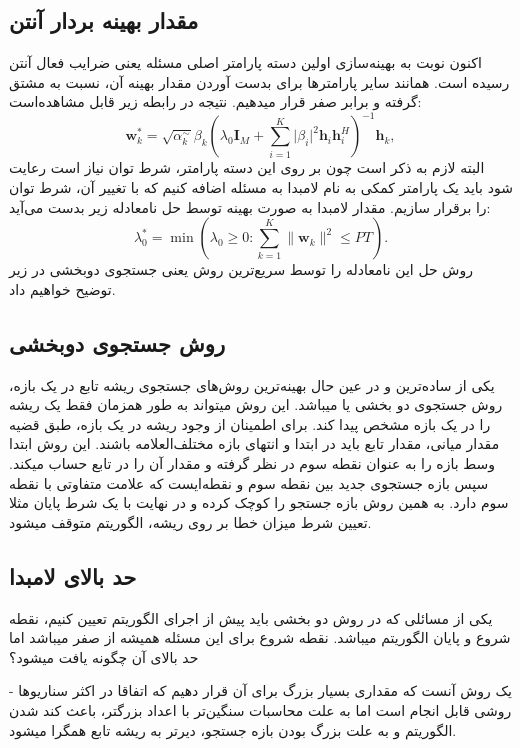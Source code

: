 \subsection{مقدار بهینه بردار آنتن}
اکنون نوبت به بهینه‌سازی اولین دسته پارامتر اصلی مسئله یعنی ضرایب فعال آنتن رسیده است. همانند سایر پارامترها برای بدست آوردن مقدار بهینه آن، نسبت به  مشتق گرفته و برابر صفر قرار میدهیم. نتیجه در رابطه زیر قابل مشاهده‌است:
\[\mathbf{w}_k^* = \sqrt{\alpha_k^\sim} \beta_k \left( \lambda_0 \mathbf{I}_M + \sum_{i=1}^{K} \lvert \beta_i \rvert^2 \mathbf{h}_i \mathbf{h}_i^H \right)^{-1} \mathbf{h}_k,
\]
البته لازم به ذکر است چون بر روی این دسته پارامتر، شرط توان نیاز است رعایت شود باید یک پارامتر کمکی به نام لامبدا به مسئله اضافه کنیم که با تغییر آن، شرط توان را برقرار سازیم.
مقدار لامبدا به صورت بهینه توسط حل نامعادله زیر بدست می‌آید:
\[
\lambda_0^* = \min \left( \lambda_0 \geq 0 : \sum_{k=1}^{K} \lVert \mathbf{w}_k \rVert^2 \leq PT \right).
\]
روش حل این نامعادله را توسط سریع‌ترین روش یعنی جستجوی دوبخشی در زیر توضیح خواهیم داد. 
\subsection{روش جستجوی دوبخشی}
یکی از ساده‌ترین و در عین حال بهینه‌ترین روش‌های جستجوی ریشه تابع در یک بازه، روش جستجوی دو بخشی یا 
میباشد. این روش میتواند به طور همزمان فقط یک ریشه را در یک بازه مشخص پیدا کند. برای اطمینان از وجود ریشه در یک بازه، طبق قضیه مقدار میانی، مقدار تابع باید در ابتدا و انتهای بازه مختلف‌العلامه باشند. این روش ابتدا وسط بازه را به عنوان نقطه سوم در نظر گرفته و مقدار آن را در تابع حساب میکند. سپس بازه جستجوی جدید بین نقطه سوم و نقطه‌ایست که علامت متفاوتی با نقطه سوم دارد. به همین روش بازه جستجو را کوچک کرده و در نهایت با یک شرط پایان مثلا تعیین شرط میزان خطا بر روی ریشه، الگوریتم متوقف میشود.

\subsection{حد بالای لامبدا}
یکی از مسائلی که در روش دو بخشی باید پیش از اجرای الگوریتم تعیین کنیم، نقطه شروع و پایان الگوریتم میباشد. نقطه شروع برای این مسئله همیشه از صفر میباشد اما حد بالای آن چگونه یافت میشود؟

- یک روش آنست که مقداری بسیار بزرگ برای آن قرار دهیم که اتفاقا در اکثر سناریوها روشی قابل انجام است اما به علت محاسبات سنگین‌تر با اعداد بزرگتر، باعث کند شدن الگوریتم و به علت بزرگ‌ بودن بازه جستجو، دیرتر به ریشه تابع همگرا میشود.

